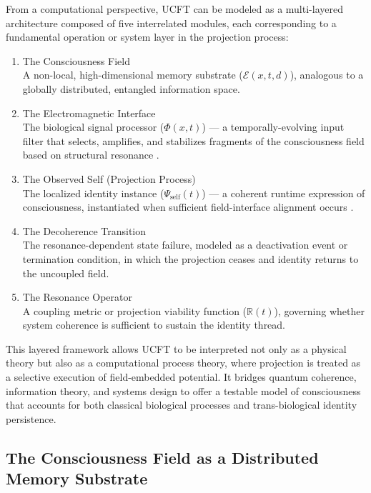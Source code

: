 \documentclass[titlepage]{article}
\begin{document}
From a computational perspective, UCFT can be modeled as a multi-layered architecture composed of five interrelated modules, each corresponding to a fundamental operation or system layer in the projection process:

\begin{enumerate}
	\item The Consciousness Field\\
	A non-local, high-dimensional memory substrate ($\mathcal{E}(x,t,d)$), analogous to a globally distributed, entangled information space.
	\item The Electromagnetic Interface\\
	The biological signal processor ($\Phi(x,t)$) — a temporally-evolving input filter that selects, amplifies, and stabilizes fragments of the consciousness field based on structural resonance \parencite{zurek2009}.
	\item The Observed Self (Projection Process)\\
	The localized identity instance ($\Psi_{\text{self}}(t)$) — a coherent runtime expression of consciousness, instantiated when sufficient field-interface alignment occurs \parencite{metzinger2009}.
	\item The Decoherence Transition\\
	The resonance-dependent state failure, modeled as a deactivation event or termination condition, in which the projection ceases and identity returns to the uncoupled field.
	\item The Resonance Operator\\
	A coupling metric or projection viability function ($\mathbb{R}(t)$), governing whether system coherence is sufficient to sustain the identity thread.
\end{enumerate}

This layered framework allows UCFT to be interpreted not only as a physical theory but also as a computational process theory, where projection is treated as a selective execution of field-embedded potential. It bridges quantum coherence, information theory, and systems design to offer a testable model of consciousness that accounts for both classical biological processes and trans-biological identity persistence.

\subsection{The Consciousness Field as a Distributed Memory Substrate}
\end{document}
